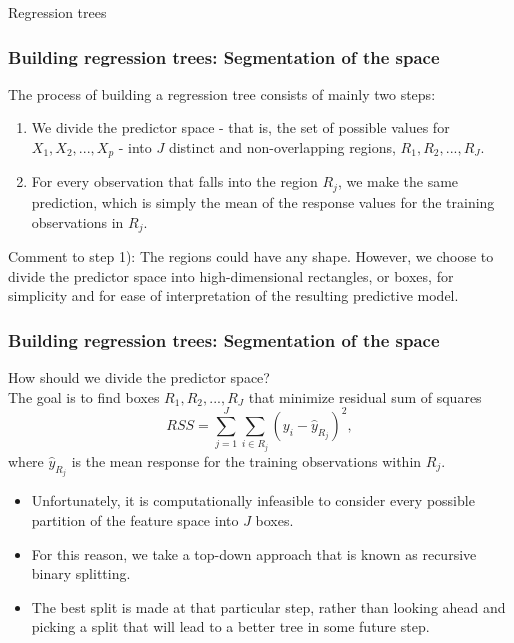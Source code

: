 \documentclass{beamer}
\begin{document}
\begin{frame}
	\begin{center}
		\Large{\textcolor{dkblue}{Regression trees}}
	\end{center}
\end{frame}


\begin{frame}\frametitle{Building regression trees: Segmentation of the space}
The process of building a regression tree consists of mainly two steps:
\vspace*{0.2cm}
	\begin{enumerate}
	  \item We divide the predictor space - that is, the set of possible values for
$X_1,X_2,...,X_p$ - into $J$ distinct and non-overlapping regions,
$R_1,R_2,...,R_J$.
\vspace*{0.2cm}
\item For every observation that falls into the region $R_j$, we make the same
prediction, which is simply the mean of the response values for the
training observations in $R_j$.
	\end{enumerate}
\vspace*{0.2cm}
Comment to step 1): The regions could have any shape. However, we
choose to divide the predictor space into high-dimensional
rectangles, or boxes, for simplicity and for ease of
interpretation of the resulting predictive model.
\end{frame}

\begin{frame}\frametitle{Building regression trees: Segmentation of the space}
How should we divide the predictor space?\\
The goal is to find boxes $R_1,R_2,...,R_J$ that minimize residual sum of squares
$$RSS=\sum_{j=1}^J\sum_{i\in R_j}\left(y_i-\hat{y}_{R_j}\right)^2,$$
where $\hat{y}_{R_j}$ is the mean response for the training observations within $R_j$.
\begin{itemize}
\item Unfortunately, it is computationally infeasible to consider
every possible partition of the feature space into $J$ boxes.
\vspace*{0.2cm}
\item For this reason, we take a top-down approach that
is known as recursive binary splitting.
\vspace*{0.2cm}
\item The best split is made at that particular step,
rather than looking ahead and picking a split that will lead
to a better tree in some future step.
\end{itemize}
\end{frame}
\end{document}
